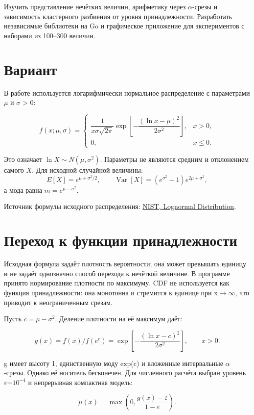 \documentclass[fontsize=14pt,a4paper]{scrartcl}
\begin{document}
Изучить представление нечётких величин, арифметику через \(\alpha\)-срезы и зависимость кластерного разбиения от уровня принадлежности. Разработать независимые библиотеки на Go и графическое приложение для экспериментов с наборами из 100–300 величин.

\section{Вариант}

В работе используется логарифмически нормальное распределение с параметрами \(\mu\) и \(\sigma\) > 0:

\[
f(x;\mu,\sigma)=\begin{cases}
\dfrac{1}{x\sigma\sqrt{2\pi}}\exp\left[-\dfrac{(\ln x-\mu)^2}{2\sigma^2}\right],&x>0,\\
0,&x\leq0.
\end{cases}
\]

Это означает $\ln X\sim N(\mu,\sigma^2)$. Параметры не являются средним и отклонением самого $X$. Для исходной случайной величины:
\[
E[X]=e^{\mu+\sigma^2/2},\qquad
\operatorname{Var}[X]=(e^{\sigma^2}-1)e^{2\mu+\sigma^2},
\]
а мода равна $m=e^{\mu-\sigma^2}$.


Источник формулы исходного распределения: \href{https://itl.nist.gov/div898/handbook/eda/section3/eda3669.htm}{NIST, Lognormal Distribution}.

\section{Переход к функции принадлежности}

Исходная формула задаёт плотность вероятности; она может превышать единицу и не задаёт однозначно способ перехода к нечёткой величине. В программе принято нормирование плотности по максимуму. CDF не используется как функция принадлежности: она монотонна и стремится к единице при x\(\to\)\(\infty\), что приводит к неограниченным срезам.

Пусть $c=\mu-\sigma^2$. Деление плотности на её максимум даёт:

\[
g(x)=f(x)/f(e^c)=\exp\left[-\frac{(\ln x-c)^2}{2\sigma^2}\right],\qquad x>0.
\]

g имеет высоту 1, единственную моду exp(c) и вложенные интервальные \(\alpha\)-срезы. Однако её носитель бесконечен. Для численного расчёта выбран уровень \(\varepsilon\)=\(10^{-4}\) и непрерывная компактная модель:

\[
\widetilde\mu(x)=\max\left(0,\frac{g(x)-\varepsilon}{1-\varepsilon}\right).
\]
\end{document}
